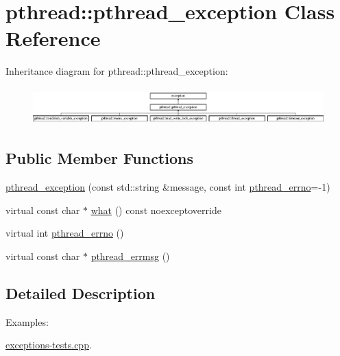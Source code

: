 \hypertarget{classpthread_1_1pthread__exception}{\section{pthread\+:\+:pthread\+\_\+exception Class Reference}
\label{classpthread_1_1pthread__exception}
}
Inheritance diagram for pthread\+:\+:pthread\+\_\+exception\+:\begin{figure}[H]
\begin{center}
\leavevmode
\includegraphics[height=1.435897cm]{classpthread_1_1pthread__exception}
\end{center}
\end{figure}
\subsection*{Public Member Functions}
\begin{DoxyCompactItemize}
\item 
\hyperlink{classpthread_1_1pthread__exception_ac52d5b544f7b86bed738afd2a5f11473}{pthread\+\_\+exception} (const std\+::string \&message, const int \hyperlink{classpthread_1_1pthread__exception_a4a869173054faca1945ac1a7729082d6}{pthread\+\_\+errno}=-\/1)
\item 
virtual const char $\ast$ \hyperlink{classpthread_1_1pthread__exception_ae54eed6aa72bac1c503554ddd857e466}{what} () const noexceptoverride
\item 
virtual int \hyperlink{classpthread_1_1pthread__exception_a4a869173054faca1945ac1a7729082d6}{pthread\+\_\+errno} ()
\item 
virtual const char $\ast$ \hyperlink{classpthread_1_1pthread__exception_afc17488e8f6160865f1beb4d6fc20d2a}{pthread\+\_\+errmsg} ()
\end{DoxyCompactItemize}


\subsection{Detailed Description}
\begin{Desc}
\item[Examples\+: ]\par
\hyperlink{exceptions-tests_8cpp-example}{exceptions-\/tests.\+cpp}.\end{Desc}


